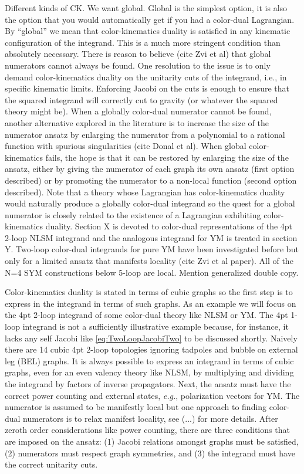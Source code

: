\documentclass[11pt,letter]{article}
\begin{document}
Different kinds of CK.
We want global.
Global is the simplest option, it is also the option that you would automatically get if you had a color-dual Lagrangian.
By ``global'' we mean that color-kinematics duality is satisfied in any kinematic configuration of the integrand.
This is a much more stringent condition than absolutely necessary.
There is reason to believe (cite Zvi et al) that global numerators cannot always be found.
One resolution to the issue is to only demand color-kinematics duality on the unitarity cuts of the integrand, i.e., in specific kinematic limits.
Enforcing Jacobi on the cuts is enough to ensure that the squared integrand will correctly cut to gravity (or whatever the squared theory might be).
When a globally color-dual numerator cannot be found, another alternative explored in the literature is to increase the size of the numerator ansatz by enlarging the numerator from a polynomial to a rational function with spurious singularities (cite Donal et al).
When global color-kinematics fails, the hope is that it can be restored by enlarging the size of the ansatz, either by giving the numerator of each graph its own ansatz (first option described) or by promoting the numerator to a non-local function (second option described).
Note that a theory whose Lagrangian has color-kinematics duality would naturally produce a globally color-dual integrand so the quest for a global numerator is closely related to the existence of a Lagrangian exhibiting color-kinematics duality.
Section X is devoted to color-dual representations of the 4pt 2-loop NLSM integrand and the analogous integrand for YM is treated in section Y.
Two-loop color-dual integrands for pure YM have been investigated before but only for a limited ansatz that manifests locality (cite Zvi et al paper).
All of the N=4 SYM constructions below 5-loop are local.
Mention generalized double copy.

Color-kinematics duality is stated in terms of cubic graphs so the first step is to express in the integrand in terms of such graphs.
As an example we will focus on the 4pt 2-loop integrand of some color-dual theory like NLSM or YM.
The 4pt 1-loop integrand is not a sufficiently illustrative example because, for instance, it lacks any self Jacobi like \eqref{eq:TwoLoopJacobiTwo} to be discussed shortly.
Naively there are 14 cubic 4pt 2-loop topologies ignoring tadpoles and bubble on external leg (BEL) graphs.
It is always possible to express an integrand in terms of cubic graphs, even for an even valency theory like NLSM, by multiplying and dividing the integrand by factors of inverse propagators.
Next, the ansatz must have the correct power counting and external states, \emph{e.g.}, polarization vectors for YM.
The numerator is assumed to be manifestly local but one approach to finding color-dual numerators is to relax manifest locality, see (...) for more details.
After zeroth order considerations like power counting, there are three conditions that are imposed on the ansatz: (1) Jacobi relations amongst graphs must be satisfied, (2) numerators must respect graph symmetries, and (3) the integrand must have the correct unitarity cuts.
\end{document}
